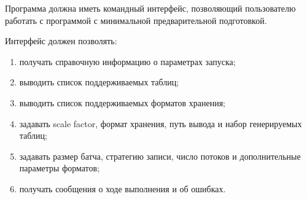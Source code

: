 Программа должна иметь командный интерфейс, позволяющий пользователю работать с программой с минимальной предварительной подготовкой. 

Интерфейс должен позволять:
\begin{enumerate}
    \item получать справочную информацию о параметрах запуска;
    \item выводить список поддерживаемых таблиц;
    \item выводить список поддерживаемых форматов хранения;
    \item задавать scale factor, формат хранения, путь вывода и набор генерируемых таблиц;
    \item задавать размер батча, стратегию записи, число потоков и дополнительные параметры форматов;
    \item получать сообщения о ходе выполнения и об ошибках.
\end{enumerate}
